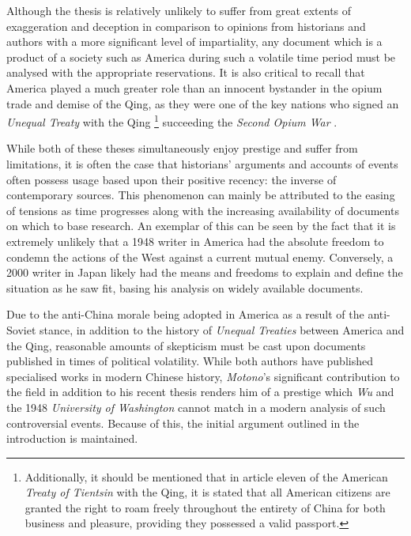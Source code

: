 \documentclass[a4paper,oneside]{article}
\begin{document}
        Although the thesis is relatively unlikely to suffer from great extents of exaggeration and deception in comparison to opinions from historians and authors with a more significant level of impartiality, any document which is a product of a society such as America during such a volatile time period must be analysed with the appropriate reservations. It is also critical to recall that America played a much greater role than an innocent bystander in the opium trade and demise of the Qing, as they were one of the key nations who signed an \textit{Unequal Treaty} with the Qing \autocite{Peters:1961}\footnote{Additionally, it should be mentioned that in article eleven of the American \textit{Treaty of Tientsin} with the Qing, it is stated that all American citizens are granted the right to roam freely throughout the entirety of China for both business and pleasure, providing they possessed a valid passport.} succeeding the \textit{Second Opium War} \autocite{Johnstone:1937}.

        While both of these theses simultaneously enjoy prestige and suffer from limitations, it is often the case that historians' arguments and accounts of events often possess usage based upon their positive recency: the inverse of contemporary sources. This phenomenon can mainly be attributed to the easing of tensions as time progresses along with the increasing availability of documents on which to base research. An exemplar of this can be seen by the fact that it is extremely unlikely that a 1948 writer in America had the absolute freedom to condemn the actions of the West against a current mutual enemy. Conversely, a 2000 writer in Japan likely had the means and freedoms to explain and define the situation as he saw fit, basing his analysis on widely available documents.

        Due to the anti-China morale being adopted in America as a result of the anti-Soviet stance, in addition to the history of \textit{Unequal Treaties} between America and the Qing, reasonable amounts of skepticism must be cast upon documents published in times of political volatility. While both authors have published specialised works in modern Chinese history, \textit{Motono}'s significant contribution to the field in addition to his recent thesis renders him of a prestige which \textit{Wu} and the 1948 \textit{University of Washington} cannot match in a modern analysis of such controversial events. Because of this, the initial argument outlined in the introduction is maintained.

\printbibliography[title={Cited Works}, heading=bibintoc]
\end{document}
